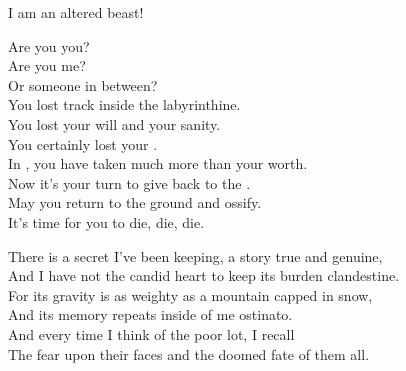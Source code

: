 I am an altered beast! \\





Are you you? \\
Are you me? \\
Or someone in between? \\

You lost track inside the labyrinthine. \\
You lost your will and your sanity. \\
You certainly lost your . \\

In , you have taken much more than your worth. \\
Now it's your turn to give back to the . \\

May you return to the ground and ossify. \\
It's time for you to die, die, die. \\









There is a secret I've been keeping, a story true and genuine, \\
And I have not the candid heart to keep its burden clandestine. \\

For its gravity is as weighty as a mountain capped in snow, \\
And its memory repeats inside of me ostinato. \\

And every time I think of the poor lot, I recall \\
The fear upon their faces and the doomed fate of them all. \\

